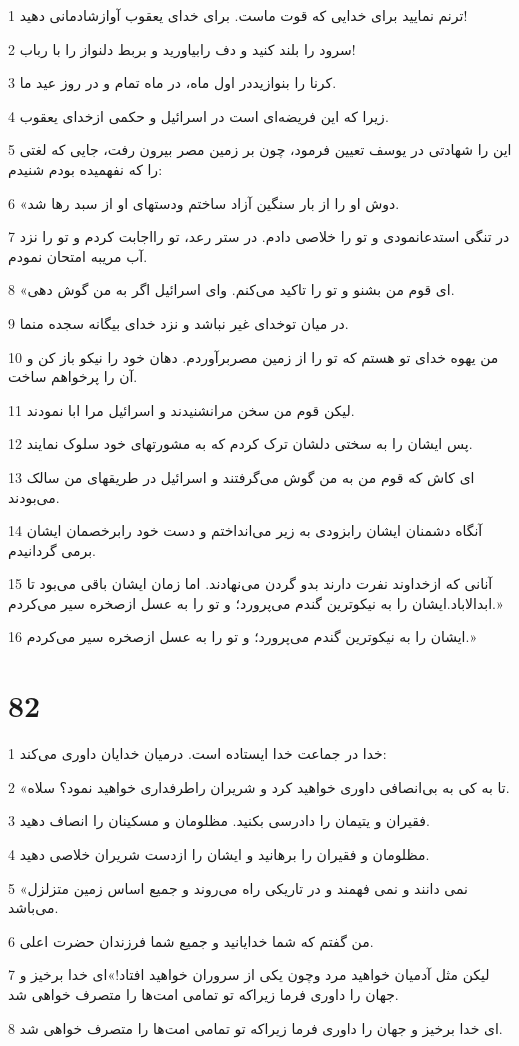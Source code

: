 \par 1 ترنم نمایید برای خدایی که قوت ماست. برای خدای یعقوب آوازشادمانی دهید!
\par 2 سرود را بلند کنید و دف رابیاورید و بربط دلنواز را با رباب!
\par 3 کرنا را بنوازیددر اول ماه، در ماه تمام و در روز عید ما.
\par 4 زیرا که این فریضه‌ای است در اسرائیل و حکمی ازخدای یعقوب.
\par 5 این را شهادتی در یوسف تعیین فرمود، چون بر زمین مصر بیرون رفت، جایی که لغتی را که نفهمیده بودم شنیدم:
\par 6 «دوش او را از بار سنگین آزاد ساختم ودستهای او از سبد رها شد.
\par 7 در تنگی استدعانمودی و تو را خلاصی دادم. در ستر رعد، تو رااجابت کردم و تو را نزد آب مریبه امتحان نمودم.
\par 8 «ای قوم من بشنو و تو را تاکید می‌کنم. وای اسرائیل اگر به من گوش دهی.
\par 9 در میان توخدای غیر نباشد و نزد خدای بیگانه سجده منما.
\par 10 من یهوه خدای تو هستم که تو را از زمین مصربرآوردم. دهان خود را نیکو باز کن و آن را پرخواهم ساخت.
\par 11 لیکن قوم من سخن مرانشنیدند و اسرائیل مرا ابا نمودند.
\par 12 پس ایشان را به سختی دلشان ترک کردم که به مشورتهای خود سلوک نمایند.
\par 13 ‌ای کاش که قوم من به من گوش می‌گرفتند و اسرائیل در طریقهای من سالک می‌بودند.
\par 14 آنگاه دشمنان ایشان رابزودی به زیر می‌انداختم و دست خود رابرخصمان ایشان برمی گردانیدم.
\par 15 آنانی که ازخداوند نفرت دارند بدو گردن می‌نهادند. اما زمان ایشان باقی می‌بود تا ابدالاباد.ایشان را به نیکوترین گندم می‌پرورد؛ و تو را به عسل ازصخره سیر می‌کردم.»
\par 16 ایشان را به نیکوترین گندم می‌پرورد؛ و تو را به عسل ازصخره سیر می‌کردم.»
 
\chapter{82}

\par 1 خدا در جماعت خدا ایستاده است. درمیان خدایان داوری می‌کند:
\par 2 «تا به کی به بی‌انصافی داوری خواهید کرد و شریران راطرفداری خواهید نمود؟ سلاه.
\par 3 فقیران و یتیمان را دادرسی بکنید. مظلومان و مسکینان را انصاف دهید.
\par 4 مظلومان و فقیران را برهانید و ایشان را ازدست شریران خلاصی دهید.
\par 5 «نمی دانند و نمی فهمند و در تاریکی راه می‌روند و جمیع اساس زمین متزلزل می‌باشد.
\par 6 من گفتم که شما خدایانید و جمیع شما فرزندان حضرت اعلی.
\par 7 لیکن مثل آدمیان خواهید مرد وچون یکی از سروران خواهید افتاد!»‌ای خدا برخیز و جهان را داوری فرما زیراکه تو تمامی امت‌ها را متصرف خواهی شد.
\par 8 ‌ای خدا برخیز و جهان را داوری فرما زیراکه تو تمامی امت‌ها را متصرف خواهی شد.
 
